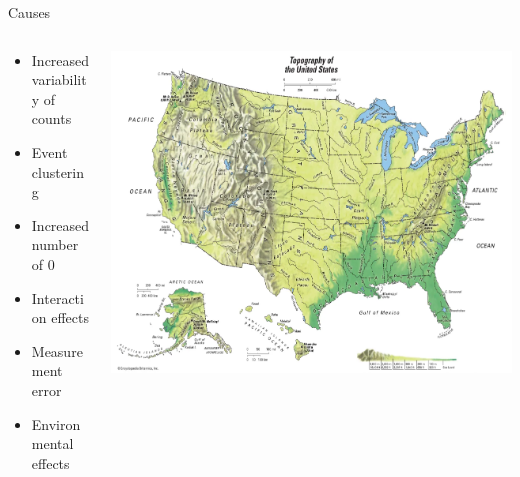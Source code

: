 \documentclass[
  ignorenonframetext,
]{beamer}
\providecommand{\tightlist}{%
  \setlength{\itemsep}{0pt}\setlength{\parskip}{0pt}}\usepackage{longtable,booktabs,array}
\begin{document}
\begin{frame}{Causes}
\protect\hypertarget{causes}{}
\begin{columns}[T]
\begin{column}{0.5\textwidth}
\begin{itemize}
\tightlist
\item
  Increased variability of counts
\item
  Event clustering
\item
  Increased number of 0
\item
  Interaction effects
\item
  Measurement error
\item
  Environmental effects
\end{itemize}
\end{column}

\begin{column}{0.5\textwidth}
\includegraphics{topographic.png}
\end{column}
\end{columns}
\end{frame}
\end{document}
